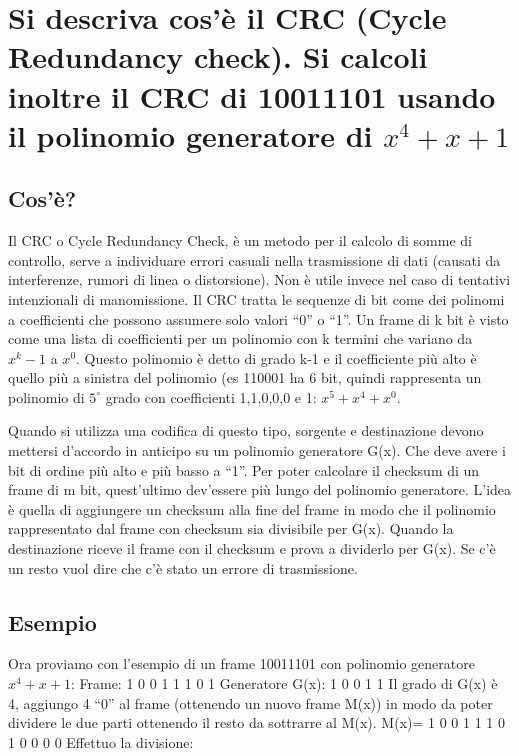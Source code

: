 \section{Si descriva cos'è il CRC (Cycle Redundancy check). Si calcoli inoltre il CRC di 10011101 usando il polinomio generatore di $x^4+x+1$}

\subsection{Cos'è?}
Il CRC o Cycle Redundancy Check, è un metodo per il calcolo di somme di controllo, serve a individuare errori casuali nella trasmissione di dati
(causati da interferenze, rumori di linea o distorsione).
Non è utile invece nel caso di tentativi intenzionali di manomissione.
Il CRC tratta le sequenze di bit come dei polinomi a coefficienti che possono assumere solo valori “0” o “1”.
Un frame di k bit è visto come una lista di coefficienti per un polinomio con k termini che variano da $x^k-1$ a $x^0$.
Questo polinomio è detto di grado k-1 e il coefficiente più alto è quello più a sinistra del polinomio
(es 110001 ha 6 bit, quindi rappresenta un polinomio di $5^{\circ}$ grado con coefficienti 1,1,0,0,0 e 1: $x^5+x^4+x^0$.

Quando si utilizza una codifica di questo tipo, sorgente e destinazione devono mettersi d'accordo in anticipo su un polinomio generatore G(x).
Che deve avere i bit di ordine più alto e più basso a “1”.
Per poter calcolare il checksum di un frame di m bit, quest'ultimo dev'essere più lungo del polinomio generatore.
L'idea è quella di aggiungere un checksum alla fine del frame in modo che il polinomio rappresentato dal frame con checksum sia divisibile per G(x).
Quando la destinazione riceve il frame con il checksum e prova a dividerlo per G(x).
Se c'è un resto vuol dire che c'è stato un errore di trasmissione.
\subsection{Esempio}
Ora proviamo con l'esempio di un frame 10011101 con polinomio generatore $x^4+x+1$:
Frame: 1 0 0 1 1 1 0 1 
Generatore G(x): 1 0 0 1 1
Il grado di G(x) è 4, aggiungo 4 “0” al frame (ottenendo un nuovo frame M(x)) in modo da poter dividere le due parti ottenendo il resto da sottrarre al M(x).
M(x)= 1 0 0 1 1 1 0 1 0 0 0 0
Effettuo la divisione: 

